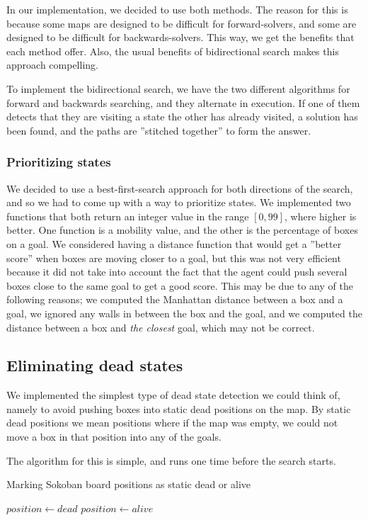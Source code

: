 \documentclass[a4paper,11pt]{article}
\begin{document}
In our implementation, we decided to use both methods.
The reason for this is because some maps are designed to be difficult
for forward-solvers, and some are designed to be difficult for backwards-solvers.
This way, we get the benefits that each method offer.
Also, the usual benefits of bidirectional search makes this approach compelling.

To implement the bidirectional search, we have the two different algorithms
for forward and backwards searching, and they alternate in execution.
If one of them detects that they are visiting a state the other has already visited,
a solution has been found, and the paths are ''stitched together'' to form the answer.

\subsubsection{Prioritizing states}
\label{sec:prio}

We decided to use a best-first-search approach for both directions of the search,
and so we had to come up with a way to prioritize states.
We implemented two functions that both return an integer value in the range
$[0, 99]$, where higher is better.
One function is a mobility value, and the other is the percentage of boxes on a goal.
We considered having a distance function that would get a ''better score''
when boxes are moving closer to a goal, but this was not very efficient
because it did not take into account the fact that the agent could push several boxes
close to the same goal to get a good score.
This may be due to any of the following reasons;
	we computed the Manhattan distance between a box and a goal,
	we ignored any walls in between the box and the goal,
	and we computed the distance between a box and \emph{the closest} goal, which may not be correct.

\subsection{Eliminating dead states}


We implemented the simplest type of dead state detection we could think of,
namely to avoid pushing boxes into static dead positions on the map.
By static dead positions we mean positions where if the map was empty,
we could not move a box in that position into any of the goals.

The algorithm for this is simple, and runs one time before the search starts.

\clearpage
\begin{algorithm}
\caption{Marking Sokoban board positions as static dead or alive}
\label{alg:dead_positions}
\begin{algorithmic}
			\State $position \gets dead$
		\EndFor
					\State $position \gets alive$
				\EndIf
			\EndFor
		\EndFor
	\EndFunction
\end{algorithmic}
\end{algorithm}
\end{document}
